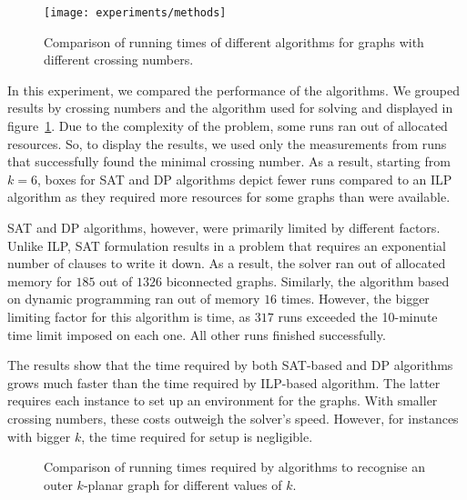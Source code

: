 \begin{figure}[tbh]
    \centering
    \texttt{[image: experiments/methods]}
    \caption{Comparison of running times of different algorithms for graphs with different crossing numbers.}
    \label{fig:methods}
\end{figure}

In this experiment, we compared the performance of the algorithms. We grouped results by crossing numbers and the algorithm used for solving and displayed in figure~\ref{fig:methods}. Due to the complexity of the problem, some runs ran out of allocated resources. So, to display the results, we used only the measurements from runs that successfully found the minimal crossing number. As a result, starting from \(k = 6\), boxes for SAT and DP algorithms depict fewer runs compared to an ILP algorithm as they required more resources for some graphs than were available.

SAT and DP algorithms, however, were primarily limited by different factors. Unlike ILP, SAT formulation results in a problem that requires an exponential number of clauses to write it down. As a result, the solver ran out of allocated memory for \(185\) out of \(1326\) biconnected graphs. Similarly, the algorithm based on dynamic programming ran out of memory \(16\) times. However, the bigger limiting factor for this algorithm is time, as \(317\) runs exceeded the 10-minute time limit imposed on each one. All other runs finished successfully.

The results show that the time required by both SAT-based and DP algorithms grows much faster than the time required by ILP-based algorithm. The latter requires each instance to set up an environment for the graphs. With smaller crossing numbers, these costs outweigh the solver's speed. However, for instances with bigger \(k\), the time required for setup is negligible.

\begin{figure}[tbh]
    \centering
     \hfill
     \hfill
     \hfill
     \hfill
    \caption{Comparison of running times required by algorithms to recognise an outer \(k\)-planar graph for different values of \(k\).}
    \label{fig:methods-vertices}
\end{figure}

